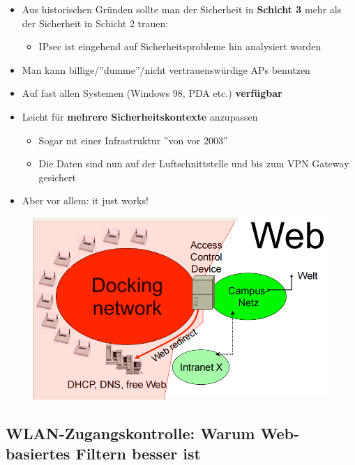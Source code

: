 \documentclass[openany]{book}
\begin{document}
\begin{itemize}
    \item Aus historischen Gründen sollte man der Sicherheit in \textbf{Schicht 3} mehr als der Sicherheit in Schicht 2 trauen:
    \begin{itemize}
        \item IPsec ist eingehend auf Sicherheitsprobleme hin analysiert worden
    \end{itemize}
    \item Man kann billige/''dumme''/nicht vertrauenswürdige APs benutzen
    \item Auf fast allen Systemen (Windows 98, PDA etc.) \textbf{verfügbar}
    \item Leicht für \textbf{mehrere Sicherheitskontexte} anzupassen
    \begin{itemize}
        \item Sogar mt einer Infrastruktur ''von vor 2003''
        \item Die Daten sind nun auf der Luftschnittstelle und bis zum VPN Gateway gesichert
    \end{itemize}
    \item Aber vor allem: it just works!
\end{itemize}

\newpage

\begin{figure}[h!]
    \centering
    \includegraphics[width=0.85\linewidth]{Pics/Web.PNG}
\end{figure}

\subsection{WLAN-Zugangskontrolle: Warum Web-basiertes Filtern besser ist}
\end{document}
